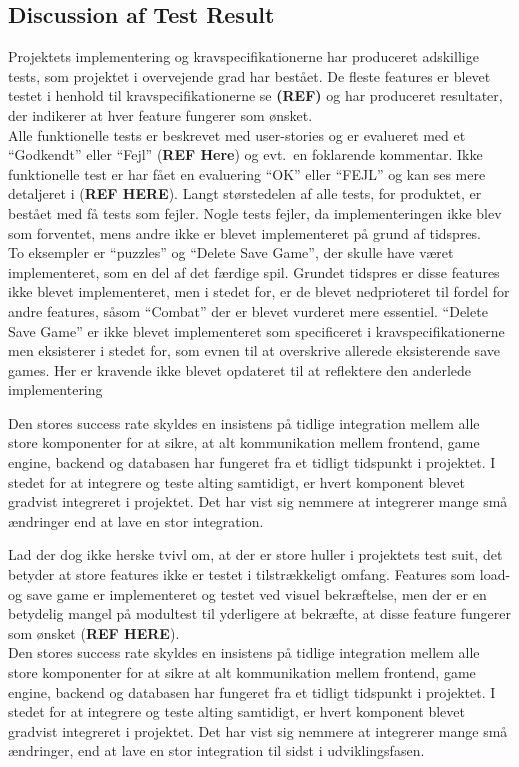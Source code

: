 \subsection{Discussion af Test Result}
Projektets implementering og kravspecifikationerne har produceret adskillige tests, som 
projektet i overvejende grad har bestået. De fleste features er blevet
testet i henhold til kravspecifikationerne se \textbf{(REF)} og har produceret 
resultater, der indikerer at hver feature fungerer som ønsket. \\

Alle funktionelle tests er beskrevet med user-stories og er evalueret med et ``Godkendt''
eller ``Fejl'' (\textbf{REF Here}) og evt.\ en foklarende kommentar. Ikke funktionelle 
test er har fået en evaluering ``OK'' eller ``FEJL'' og kan ses mere detaljeret i (\textbf{REF HERE}).
Langt størstedelen af alle tests, for produktet, er bestået med få tests som fejler. 
Nogle tests fejler, da implementeringen ikke blev som forventet, mens andre ikke er blevet 
implementeret på grund af tidspres. \\

To eksempler er ``puzzles'' og ``Delete Save Game'', der skulle have været implementeret, som en del af det færdige spil.
Grundet tidspres er disse features ikke blevet implementeret, men i stedet for, er de blevet
nedprioteret til fordel for andre features, såsom ``Combat'' der er blevet vurderet mere essentiel.
``Delete Save Game'' er ikke blevet implementeret som specificeret i kravspecifikationerne men
eksisterer i stedet for, som evnen til at overskrive allerede eksisterende save games. Her er 
kravende ikke blevet opdateret til at reflektere den anderlede implementering

Den stores success rate skyldes en insistens på tidlige integration mellem alle store komponenter for at sikre, at 
alt kommunikation mellem frontend, game engine, backend og databasen har fungeret fra et tidligt 
tidspunkt i projektet. I stedet for at integrere og teste alting samtidigt, er hvert komponent 
blevet gradvist integreret i projektet. Det har vist sig nemmere at integrerer mange små ændringer
end at lave en stor integration.

Lad der dog ikke herske tvivl om, at der er store huller i projektets test suit, det
betyder at store features ikke er testet i tilstrækkeligt omfang. Features som load- og save game er implementeret og testet ved visuel bekræftelse, men der er en betydelig mangel på modultest til yderligere at bekræfte, at disse feature fungerer som ønsket (\textbf{REF HERE}). \\

Den stores success rate skyldes en insistens på tidlige integration mellem alle store komponenter for at sikre at alt kommunikation mellem frontend, game engine, backend og databasen har fungeret fra et tidligt tidspunkt i projektet.
I stedet for at integrere og teste alting samtidigt, er hvert komponent blevet gradvist integreret i projektet. Det har vist sig nemmere at integrerer mange små ændringer, end at lave en stor integration til sidst i udviklingsfasen.


